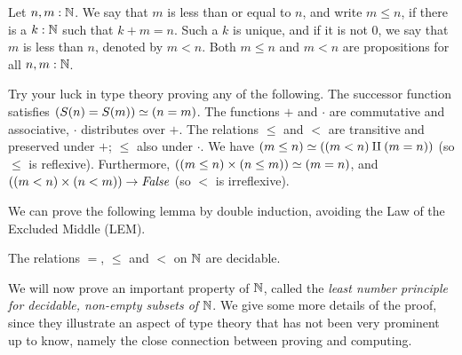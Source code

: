 \begin{definition}
\label{def:orderonN}
Let $n,m:\mathbb{N}$. We say that $m$ is less than or equal to $n$, and write $m\leq n$,
if there is a $k:\mathbb{N}$ such that $k+m=n$. Such a $k$ is unique, and if it
is not $0$, we say that $m$ is less than $n$, denoted by $m<n$.
Both $m\leq n$ and $m<n$ are propositions for all $n,m:\mathbb{N}$.
\end{definition}

\begin{xca}\label{xca:try-your-luck-N}
Try your luck in type theory proving any of the following.
The successor function satisfies $(S(n)=S(m))\simeq(n=m)$.
The functions $+$ and $\cdot$ are commutative and associative,
$\cdot$ distributes over $+$.
The relations $\leq$ and $<$ are transitive and
preserved under $+$; $\leq$ also under $\cdot$. 
We have $(m\leq n) \simeq ((m<n)\amalg(m=n))$ (so $\leq$ is reflexive).
Furthermore, $((m\leq n)\times (n\leq m)) \simeq (m=n)$,
and $((m<n)\times(n<m))\to\mathop{\mathit{False}}$ (so $<$ is irreflexive).
\end{xca}

We can prove the following lemma by double induction, avoiding the 
Law of the Excluded Middle (LEM).

\begin{lemma}\label{lem:dec-eq+order-N}
The relations $=$, $\leq$ and $<$ on $\mathbb{N}$ are decidable.
\end{lemma}

We will now prove an important property of $\mathbb{N}$, called the
\emph{least number principle for decidable, non-empty subsets of} $\mathbb{N}$.
We give some more details of the proof, since they illustrate an aspect
of type theory that has not been very prominent up to know, namely
the close connection between proving and computing.

